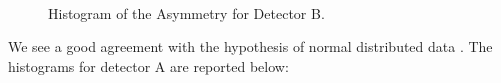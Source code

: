 \begin{figure}[hbtp]
\centering
{}
\\
\caption{Histogram of the Asymmetry for Detector B.}
\end{figure}



We see a good agreement with the hypothesis of normal distributed data . The histograms for detector A are reported below:

